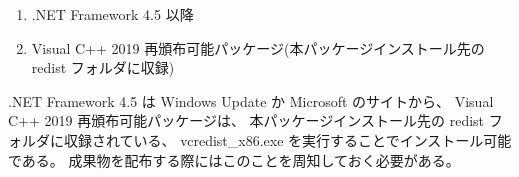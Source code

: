 \documentclass[a4paper]{jsarticle}
\begin{document}
\begin{enumerate}
\item .NET Framework 4.5 以降
\item Visual C++ 2019 再頒布可能パッケージ(本パッケージインストール先の redist フォルダに収録)
\end{enumerate}

.NET Framework 4.5 は Windows Update か Microsoft のサイトから、
Visual C++ 2019 再頒布可能パッケージは、
本パッケージインストール先の redist フォルダに収録されている、
vcredist\_x86.exe を実行することでインストール可能である。
成果物を配布する際にはこのことを周知しておく必要がある。
\end{document}
